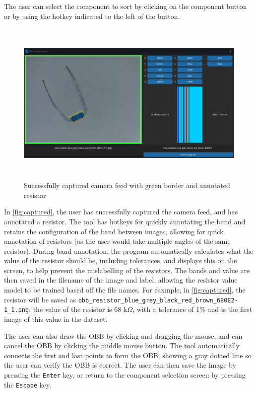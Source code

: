 The user can select the component to sort by clicking on the component button or by using the hotkey indicated to the left of the button.  

\begin{figure}[H]
    \hfill
    \begin{minipage}[t]{\textwidth}
      \centering
      \includegraphics[height=8cm]{imgs/python/captured.jpg}
      \caption{Successfully captured camera feed with green border and annotated resistor}
        \label{fig:captured}
    \end{minipage}
\end{figure}

In \autoref{fig:captured}, the user has successfully captured the camera feed, and has annotated a resistor. The tool has hotkeys for quickly annotating the band and retains the configuration of the band between images, allowing for quick annotation of resistors (as the user would take multiple angles of the same resistor). During band annotation, the program automatically calculates what the value of the resistor should be, including tolerances, and displays this on the screen, to help prevent the mislabelling of the resistors. The bands and value are then saved in the filename of the image and label, allowing the resistor value model to be trained based off the file names. For eaxmple, in \autoref{fig:captured}, the resistor will be saved as \texttt{obb\_resistor\_blue\_grey\_black\_red\_brown\_680E2-1\_1.png}; the value of the resistor is 68 k$\Omega$, with a tolerance of 1\% and is the first image of this value in the dataset.

The user can also draw the OBB by clicking and dragging the mouse, and can cancel the OBB by clicking the middle mouse button. The tool automatically connects the first and last points to form the OBB, showing a gray dotted line so the user can verify the OBB is correct. The user can then save the image by pressing the \texttt{Enter} key, or return to the component selection screen by pressing the \texttt{Escape} key.

